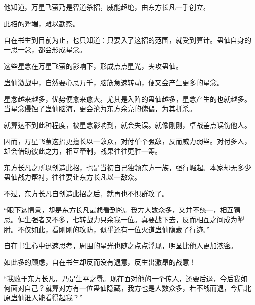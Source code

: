 \begin{this_body}
他知道，万星飞萤乃是智道杀招，威能超绝，由东方长凡一手创立。

此招的弊端，难以勘察。

自在书生到目前为止，也只知道：只要入了这招的范围，就受到算计。蛊仙自身的一思一念，都会形成星念。

这些星念在万星飞萤的影响下，形成点点星光，夹攻蛊仙。

蛊仙激战中，自然要心思万千，脑筋急速转动，便又会产生更多的星念。

星念越来越多，优势便愈来愈大。尤其是入阵的蛊仙越多，星念产生的也就越多。当星念侵蚀了蛊仙脑海，更会沦为东方余亮的傀儡，为其拼杀。

就算达不到此种程度，被星念影响到，就会失误。就像刚刚，卓战差点误伤他人。

因而，万星飞萤这招更擅长以一敌众，对付单个强敌，反而威力弱些。对付多人，却会借助彼此之力，相互牵制，战果往往更胜一筹。

东方长凡之所以创造此招，也是当初自己独领东方一族，强行崛起。本家却无多少蛊仙战力帮衬，往往要让东方长凡以一敌众。

不过，东方长凡自创造此招之后，就再也不惧群攻了。

“眼下这情景，却是东方长凡最想看到的。我方人数众多，又并不统一，相互猜忌。偏生强者又不多，七转战力只余我一位。真要战下去，反而相互之间成为掣肘。不仅如此，看刚刚的攻防，似乎还有一位火道蛊仙隐藏了行迹。”

自在书生心中迅速思考，周围的星光也随之点点浮现，明显比他人更加浓密。

如此多的顾虑，自在书生却反而没有退意，反生出激昂的战意！

“我败于东方长凡，乃是生平之辱。现在面对他的一个传人，还要后退，今后我如何面对自己？就算对方有一位蛊仙隐藏，我方也是人数众多，若不战而退，今后北原蛊仙谁人能看得起我？”

\end{this_body}

